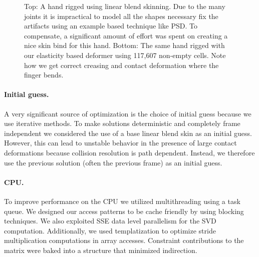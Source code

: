 \begin{figure}[tb]
\caption[A hand rigged using linear blend skinning and our method.]{Top: A hand rigged using linear blend skinning. Due to the many joints
it is impractical to model all the shapes necessary fix the artifacts using an
example based technique like PSD. To compensate, a significant amount of effort was
spent on creating a nice skin bind for this hand. Bottom: The same hand rigged with our
elasticity based deformer using 117,607 non-empty cells. Note how we get correct creasing and contact
deformation where the finger bends.}
\label{fig:hand}
\end{figure}

\paragraph{Initial guess.} A very significant source of optimization is the choice of initial guess because
we use iterative methods.  To make solutions deterministic and completely frame
independent we considered the use of a base linear blend skin as an initial
guess. However, this can lead to unstable behavior in the presence of large
contact deformations because collision resolution is path dependent. Instead, we therefore use the previous
solution (often the previous frame) as an initial guess. 

\paragraph{CPU.} To improve performance on the CPU we utilized multithreading using a task
queue. We designed our access patterns to be cache friendly by using blocking
techniques.  We also exploited SSE data level parallelism for the SVD
computation. Additionally, we used templatization to optimize stride
multiplication computations in array accesses. Constraint contributions to the
matrix were baked into a structure that minimized indirection.

